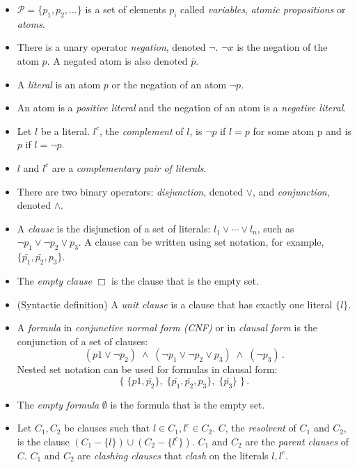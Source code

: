 \documentclass[11pt]{report}
\newcommand*{\ngg}{\mathop{\neg}}
\begin{document}
\begin{itemize}
\item $\mathcal{P}=\{p_1,p_2,\ldots\}$ is a set of elements $p_i$ called \emph{variables}, \emph{atomic propositions} or \emph{atoms}.
\item There is a unary operator \emph{negation}, denoted $\ngg$. $\ngg x$ is the negation of the atom $p$. A negated atom is also denoted $\bar{p}$.
\item A \emph{literal} is an atom $p$ or the negation of an atom $\ngg p$. 
\item An atom is a \emph{positive literal} and the negation of an atom
is a \emph{negative literal}.
\item Let $l$ be a literal. $l^c$, the \emph{complement} of $l$, is $\ngg p$ if
$l=p$ for some atom p and is $p$ if $l=\ngg p$.
\item $l$ and $l^c$ are a \emph{complementary pair of literals}.
\item There are two binary operators: \emph{disjunction}, denoted $\vee$, and \emph{conjunction}, denoted $\wedge$.
\item A \emph{clause} is the disjunction of a set of literals: $l_1 \vee \cdots \vee l_n$, such as $\ngg p_1 \vee \ngg p_2 \vee p_3$. A clause can be written using set notation, for example, $\{\bar{p_1}, \bar{p_2}, p_3\}$.
\item The \emph{empty clause} $\Box$ is the clause that is the empty set.
\item (Syntactic definition) A \emph{unit clause} is a clause that has exactly one literal $\{l\}$.
\item A \emph{formula} in \emph{conjunctive normal form (CNF)} or in \emph{clausal form} is the conjunction of a set of clauses:
\[
(p1 \vee \ngg p_2) \; \wedge \; (\ngg p_1 \vee \ngg p_2 \vee p_3) \;\wedge\; (\ngg p_3)\,.
\]
Nested set notation can be used for formulas in clausal form:
\[
\{\;\{p1, \bar{p_2}\}, \; \{\bar{p_1}, \bar{p_2}, p_3\}, \; \{\bar{p_3}\}\;\}\,.
\]

\item The \emph{empty formula} $\emptyset$ is the formula that is the empty set.

\item Let $C_{1},C_{2}$ be clauses such that $l\in C_{1},l^{c}\in C_{2}$. $C$, the \emph{resolvent} of $C_{1}$ and $C_{2}$, is the clause $(C_{1}-\{l\}) \cup (C_{2}-\{l^{c}\})$. $C_{1}$ and $C_{2}$ are the \emph{parent clauses} of $C$. $C_{1}$ and $C_{2}$ are \emph{clashing clauses} that \emph{clash} on the literals $l,l^c$.


\end{itemize}
\end{document}
